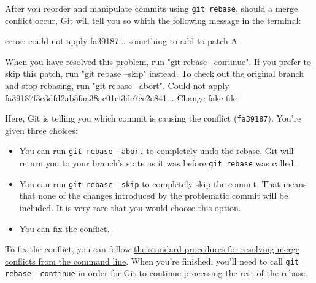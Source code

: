 After you reorder and manipulate commits using \texttt{git rebase}, should a merge conflict occur, Git will tell you so whith the following message in the terminal:
\begin{codeblock}[language=bash]
error: could not apply fa39187... something to add to patch A

When you have resolved this problem, run "git rebase --continue".
If you prefer to skip this patch, run "git rebase --skip" instead.
To check out the original branch and stop rebasing, run "git rebase --abort".
Could not apply fa39187f3c3dfd2ab5faa38ac01cf3de7ce2e841... Change fake file
\end{codeblock}

Here, Git is telling you which commit is causing the conflict (\texttt{fa39187}). You're given three choices:
\begin{itemize}
    \item You can run \texttt{git rebase --abort} to completely undo the rebase. Git will return you to your branch's state as it was before \texttt{git rebase} was called.
    \item You can run \texttt{git rebase --skip} to completely skip the commit. That means that none of the changes introduced by the problematic commit will be included. It is very rare that you would choose this option. 
    \item You can fix the conflict. 
\end{itemize}

To fix the conflict, you can follow \href{https://docs.github.com/en/pull-requests/collaborating-with-pull-requests/addressing-merge-conflicts/resolving-a-merge-conflict-using-the-command-line}{the standard procedures for resolving merge conflicts from the command line}. When you're finished, you'll need to call \texttt{git rebase --continue} in order for Git to continue processing the rest of the rebase.
